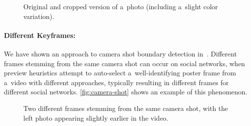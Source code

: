\begin{figure}[h!]
  \centering
  \caption[Original and cropped version of a~photo]
  {Original and cropped version of a~photo (including a~slight color variation).}
  \label{fig:cropping}  
\end{figure}

\paragraph{Different Keyframes:}

We have shown an approach to camera shot boundary detection in~\cite{steiner2012shotdetection}.
Different frames stemming from the same camera shot
can occur on social networks, when preview heuristics
attempt to auto-select a~well-identifying poster frame from a~video with different approaches,
typically resulting in different frames for different social networks.
\autoref{fig:camera-shot} shows an example of this phenomenon.

\begin{figure}[h!]
  \centering
  \caption[Two different frames stemming from the same camera shot]
    {Two different frames stemming from the same camera shot,
    with the left photo appearing slightly earlier in the video.}
  \label{fig:camera-shot}  
\end{figure}

